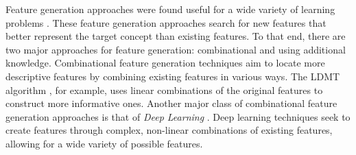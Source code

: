 \documentclass[twoside,11pt]{article}
\theoremstyle{definition}
\begin{document}
Feature generation approaches were found useful for a wide variety of learning problems \cite{markovitch2002feature,ragavan1993complex,utgo1991linear}.
These feature generation approaches search for new features that better represent the target concept than existing features. To that end, there are two major approaches for feature generation: combinational and using additional knowledge.
Combinational feature generation techniques aim to locate more descriptive features by combining existing features in various ways. The LDMT algorithm \cite{utgo1991linear}, for example, uses linear combinations of the original features to construct more informative ones. 
Another major class of combinational feature generation approaches is that of \emph{Deep Learning} \cite{lecun1998gradient,bengio2009learning,plotz2011featurefull,kim2013deepfull}. Deep learning techniques seek to create features through complex, non-linear combinations of existing features, allowing for a wide variety of possible features.
\end{document}
